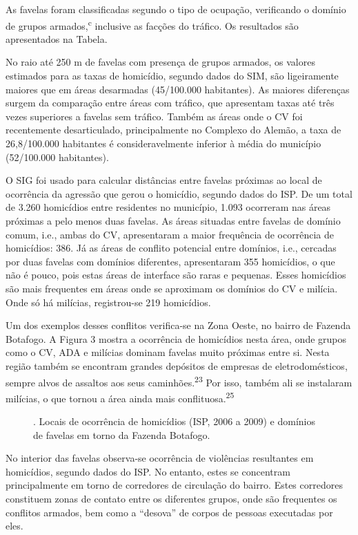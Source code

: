 \documentclass{article}
\begin{document}
As favelas foram classificadas segundo o tipo de ocupação, verificando o domínio
de grupos armados,\textsuperscript{c}
inclusive as facções do tráfico. Os resultados são apresentados na Tabela.

No raio até 250 m de favelas com presença de grupos armados, os valores
estimados para as taxas de homicídio, segundo dados do SIM, são ligeiramente
maiores que em áreas desarmadas (45/100.000 habitantes). As maiores diferenças
surgem da comparação entre áreas com tráfico, que apresentam taxas até três
vezes superiores a favelas sem tráfico. Também as áreas onde o CV foi
recentemente desarticulado, principalmente no Complexo do Alemão, a taxa de
26,8/100.000 habitantes é consideravelmente inferior à média do município
(52/100.000 habitantes).

O SIG foi usado para calcular distâncias entre favelas próximas ao local de
ocorrência da agressão que gerou o homicídio, segundo dados do ISP. De um total
de 3.260 homicídios entre residentes no município, 1.093 ocorreram nas áreas
próximas a pelo menos duas favelas. As áreas situadas entre favelas de domínio
comum, i.e., ambas do CV, apresentaram a maior frequência de ocorrência de
homicídios: 386. Já as áreas de conflito potencial entre domínios, i.e.,
cercadas por duas favelas com domínios diferentes, apresentaram 355 homicídios,
o que não é pouco, pois estas áreas de interface são raras e pequenas. Esses
homicídios são mais frequentes em áreas onde se aproximam os domínios do CV e
milícia. Onde só há milícias, registrou-se 219 homicídios.

Um dos exemplos desses conflitos verifica-se na Zona Oeste, no bairro de Fazenda
Botafogo. A Figura 3 mostra a ocorrência de homicídios nesta área, onde grupos
como o CV, ADA e milícias dominam favelas muito próximas entre si. Nesta região
também se encontram grandes depósitos de empresas de eletrodomésticos, sempre
alvos de assaltos aos seus caminhões.\textsuperscript{23}
Por isso, também ali se instalaram milícias, o que tornou a área ainda mais
conflituosa.\textsuperscript{25}

\begin{figure}
\caption{. Locais de ocorrência de homicídios (ISP, 2006 a 2009) e domínios de
favelas em torno da Fazenda Botafogo.}
\end{figure}

No interior das favelas observa-se ocorrência de violências resultantes em
homicídios, segundo dados do ISP. No entanto, estes se concentram principalmente
em torno de corredores de circulação do bairro. Estes corredores constituem
zonas de contato entre os diferentes grupos, onde são frequentes os conflitos
armados, bem como a “desova” de corpos de pessoas executadas por eles.
\end{document}
